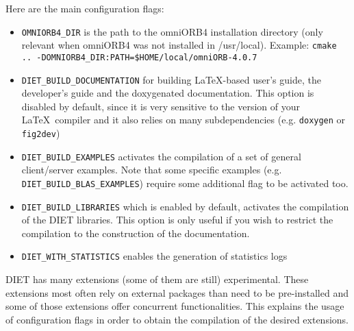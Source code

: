 Here are the main configuration flags:
\begin{itemize}
\item
  \verb+OMNIORB4_DIR+ is the path to the omniORB4 installation directory
  (only relevant when omniORB4 was not installed in /usr/local).
  Example: \verb+cmake .. -DOMNIORB4_DIR:PATH=$HOME/local/omniORB-4.0.7+

\item
  \verb+DIET_BUILD_DOCUMENTATION+ for building LaTeX-based user's guide,
  the developer's guide and the doxygenated documentation.
  This option is disabled by default, since it is very sensitive to the
  version of your \LaTeX\ compiler and it also relies on many subdependencies
  (e.g. \verb+doxygen+ or \verb+fig2dev+)

\item
  \verb+DIET_BUILD_EXAMPLES+ activates the compilation of a set of
  general client/server examples. Note that some specific examples
  (e.g. \verb+DIET_BUILD_BLAS_EXAMPLES+) require some additional flag
  to be activated too.

\item
  \verb+DIET_BUILD_LIBRARIES+ which is enabled by default, activates the
  compilation of the DIET libraries. This option is only useful if you 
  wish to restrict the compilation to the construction of the documentation.

\item
  \verb+DIET_WITH_STATISTICS+ enables the generation of statistics logs
\end{itemize}

\noindent
DIET has many extensions (some of them are still) experimental. These
extensions most often rely on external packages than need to be pre-installed
and some of those extensions offer concurrent functionalities. This explains
the usage of configuration flags in order to obtain the compilation of
the desired extensions.

